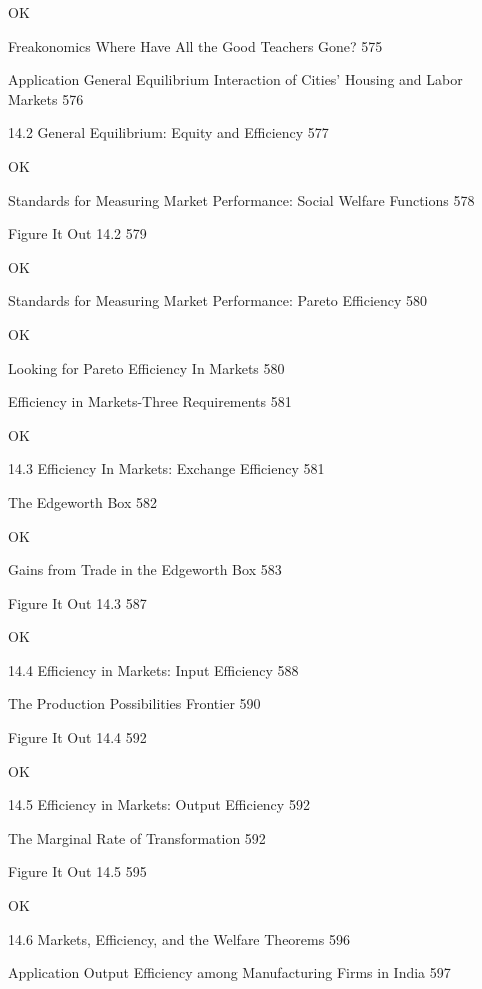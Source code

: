 OK

Freakonomics Where Have All the Good Teachers Gone? 575



Application General Equilibrium Interaction of Cities' Housing and Labor Markets 576



14.2 General Equilibrium: Equity and Efficiency 577

OK

Standards for Measuring Market Performance: Social Welfare Functions 578



Figure It Out 14.2 579

OK

Standards for Measuring Market Performance: Pareto Efficiency 580

OK

Looking for Pareto Efficiency In Markets 580



Efficiency in Markets-Three Requirements 581

OK

14.3 Efficiency In Markets: Exchange Efficiency 581



The Edgeworth Box 582

OK

Gains from Trade in the Edgeworth Box 583



Figure It Out 14.3 587

OK

14.4 Efficiency in Markets: Input Efficiency 588



The Production Possibilities Frontier 590



Figure It Out 14.4 592

OK

14.5 Efficiency in Markets: Output Efficiency 592



The Marginal Rate of Transformation 592



Figure It Out 14.5 595

OK

14.6 Markets, Efficiency, and the Welfare Theorems 596



Application Output Efficiency among Manufacturing Firms in India 597



